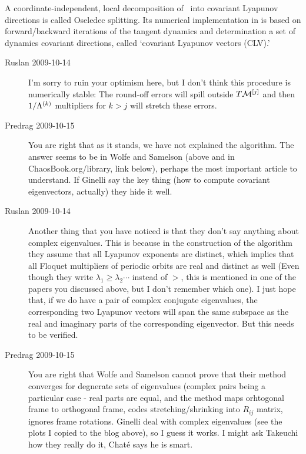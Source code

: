 A coordinate-independent, local decomposition of \statesp\
into covariant Lyapunov directions is called Oseledec
splitting.
Its numerical implementation in 
is based on forward/backward
iterations of the tangent dynamics and determination
a set of dynamics covariant directions,
called `covariant Lyapunov vectors (CLV).'

\begin{description}
  \item[Ruslan 2009-10-14] I'm sorry to ruin your optimism
      here, but I don't think this procedure is numerically
      stable: The round-off errors will spill outside
      $T{\cal M}^{[j]}$ and then $1/\Lambda^{(k)}$ multipliers
      for $k > j$ will stretch these errors.

\item[Predrag 2009-10-15]
You are right that as it stands, we have not explained the
algorithm. The answer seems to be in Wolfe and
Samelson (above and in ChaosBook.org/library, link
below), perhaps the most important article to understand.
If Ginelli \etal{} say the key thing (how
to compute covariant eigenvectors, actually) they hide it
well.

  \item[Ruslan 2009-10-14]
Another thing that you have noticed is that they don't say
anything about complex eigenvalues.  This is because in the
construction of the algorithm they assume that all Lyapunov
exponents are distinct, which implies that all Floquet
multipliers of periodic orbits are real and distinct as well
(Even though they write $\lambda_1 \geq \lambda_2 \cdots$
instead of $>$, this is mentioned in one of the papers you
discussed above, but I don't remember which one).  I just
hope that, if we do have a pair of complex conjugate
eigenvalues, the corresponding two Lyapunov vectors will span
the same subspace as the real and imaginary parts of the
corresponding eigenvector.  But this needs to be verified.

\item[Predrag 2009-10-15]
You are right that Wolfe and Samelson cannot prove
that their method converges for degnerate sets of eigenvalues
(complex pairs being a particular case - real parts are
equal, and the method maps orhtogonal frame to orthogonal
frame, codes stretching/shrinking into $R_{ij}$ matrix,
ignores frame rotations. Ginelli \etal{}
deal with complex eigenvalues (see the plots I copied to the
blog above), so I guess it works. I might ask Takeuchi how
they really do it, Chat\'e says he is smart.


\end{description}

